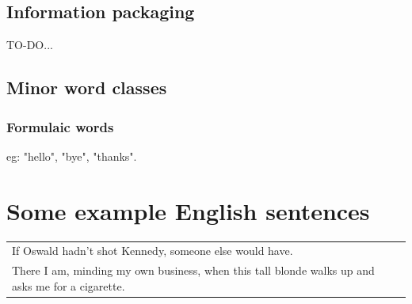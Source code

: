 \subsection{Information packaging}

TO-DO...

\subsection{Minor word classes}

\subsubsection{Formulaic words}

eg: "hello", "bye", "thanks".

\section{Some example English sentences}
\label{sec:English-examples}

\underconst

\begin{tabular}{|l|l|}
If Oswald hadn't shot Kennedy, someone else would have. & \formula{?} \\
There I am, minding my own business, when this tall blonde walks up and asks me for a cigarette. & \formula{?} \\
\end{tabular}
